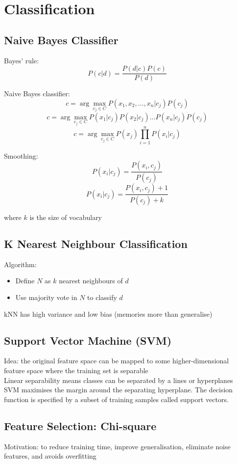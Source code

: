 \chapter{Classification}
\begin{multicols*}{2}

\section{Naive Bayes Classifier}

\noindent Bayes' rule:
$$P(c|d) = \frac{P(d|c) P(c)}{P(d)}$$

\noindent Naive Bayes classifier:
$$c=\arg\!\max_{c_j \in C} P(x_1, x_2, \ldots,x_n|c_j)P(c_j)$$
$$c=\arg\!\max_{c_j \in C} P(x_1|c_j)P(x_2|c_j)\ldots P(x_n|c_j)P(c_j)$$
$$c=\arg\!\max_{c_j \in C} P(x_j) \prod_{i=1}^n P(x_i|c_j)$$

\noindent Smoothing:
$$P(x_i|c_j) = \frac{P(x_i,c_j)}{P(c_j)}$$
$$P(x_i|c_j) = \frac{P(x_i,c_j)+1}{P(c_j)+k}$$

\noindent where $k$ is the size of vocabulary

\section{K Nearest Neighbour Classification}
\noindent Algorithm:
\begin{itemize}
    \item Define $N$ as $k$ nearest neighbours of $d$
    \item Use majority vote in $N$ to classify $d$
\end{itemize}
\noindent kNN has high variance and low bias (memories more than generalise)

\section{Support Vector Machine (SVM)}
\noindent Idea: the original feature space can be mapped to some higher-dimensional feature space where the training set is separable\\

\noindent Linear separability means classes can be separated by a lines or hyperplanes\\

\noindent SVM maximises  the margin around the separating hyperplane. The decision function is specified by a subset of training samples called support vectors. 

\section{Feature Selection: Chi-square}
\noindent Motivation: to reduce training time, improve generalisation, eliminate noise features, and avoids overfitting\\


\end{multicols*}
